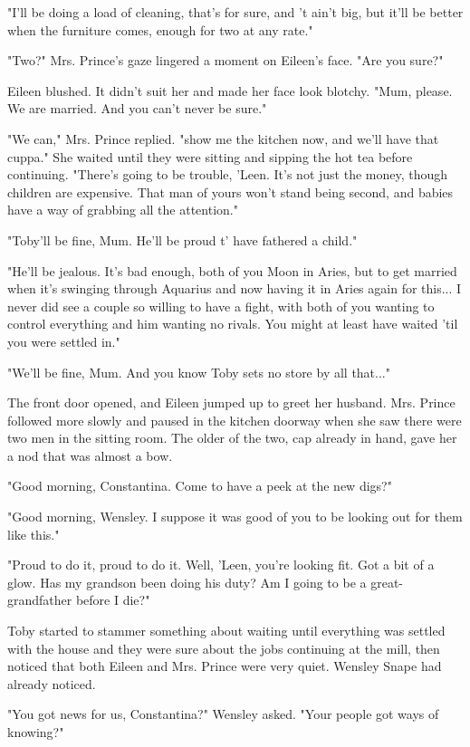"I'll be doing a load of cleaning, that's for sure, and 't ain't big, but it'll be better when the furniture comes, enough for two at any rate."

"Two?" Mrs. Prince's gaze lingered a moment on Eileen's face. "Are you sure?"

Eileen blushed. It didn't suit her and made her face look blotchy. "Mum, please. We are married. And you can't never be sure."

"We can," Mrs. Prince replied. "show me the kitchen now, and we'll have that cuppa." She waited until they were sitting and sipping the hot tea before continuing. "There's going to be trouble, 'Leen. It's not just the money, though children are expensive. That man of yours won't stand being second, and babies have a way of grabbing all the attention."

"Toby'll be fine, Mum. He'll be proud t' have fathered a child."

"He'll be jealous. It's bad enough, both of you Moon in Aries, but to get married when it's swinging through Aquarius and now having it in Aries again for this... I never did see a couple so willing to have a fight, with both of you wanting to control everything and him wanting no rivals. You might at least have waited 'til you were settled in."

"We'll be fine, Mum. And you know Toby sets no store by all that..."

The front door opened, and Eileen jumped up to greet her husband. Mrs. Prince followed more slowly and paused in the kitchen doorway when she saw there were two men in the sitting room. The older of the two, cap already in hand, gave her a nod that was almost a bow.

"Good morning, Constantina. Come to have a peek at the new digs?"

"Good morning, Wensley. I suppose it was good of you to be looking out for them like this."

"Proud to do it, proud to do it. Well, 'Leen, you're looking fit. Got a bit of a glow. Has my grandson been doing his duty? Am I going to be a great-grandfather before I die?"

Toby started to stammer something about waiting until everything was settled with the house and they were sure about the jobs continuing at the mill, then noticed that both Eileen and Mrs. Prince were very quiet. Wensley Snape had already noticed.

"You got news for us, Constantina?" Wensley asked. "Your people got ways of knowing?"

